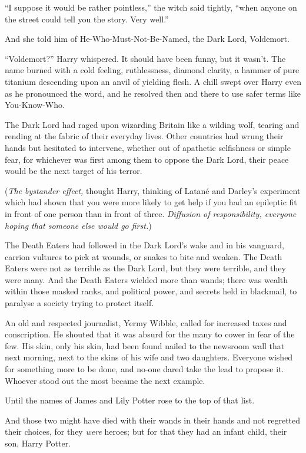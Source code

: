 “I suppose it would be rather pointless,” the witch said tightly, “when anyone on the street could tell you the story. Very well.”

And she told him of He-Who-Must-Not-Be-Named, the Dark Lord, Voldemort.

“Voldemort?” Harry whispered. It should have been funny, but it wasn’t. The name burned with a cold feeling, ruthlessness, diamond clarity, a hammer of pure titanium descending upon an anvil of yielding flesh. A chill swept over Harry even as he pronounced the word, and he resolved then and there to use safer terms like You-Know-Who.

The Dark Lord had raged upon wizarding Britain like a wilding wolf, tearing and rending at the fabric of their everyday lives. Other countries had wrung their hands but hesitated to intervene, whether out of apathetic selfishness or simple fear, for whichever was first among them to oppose the Dark Lord, their peace would be the next target of his terror.

(\emph{The bystander effect,} thought Harry, thinking of Latané and Darley’s experiment which had shown that you were more likely to get help if you had an epileptic fit in front of one person than in front of three. \emph{Diffusion of responsibility, everyone hoping that someone else would go first.})

The Death Eaters had followed in the Dark Lord’s wake and in his vanguard, carrion vultures to pick at wounds, or snakes to bite and weaken. The Death Eaters were not as terrible as the Dark Lord, but they were terrible, and they were many. And the Death Eaters wielded more than wands; there was wealth within those masked ranks, and political power, and secrets held in blackmail, to paralyse a society trying to protect itself.

An old and respected journalist, Yermy Wibble, called for increased taxes and conscription. He shouted that it was absurd for the many to cower in fear of the few. His skin, only his skin, had been found nailed to the newsroom wall that next morning, next to the skins of his wife and two daughters. Everyone wished for something more to be done, and no-one dared take the lead to propose it. Whoever stood out the most became the next example.

Until the names of James and Lily Potter rose to the top of that list.

And those two might have died with their wands in their hands and not regretted their choices, for they \emph{were} heroes; but for that they had an infant child, their son, Harry Potter.

